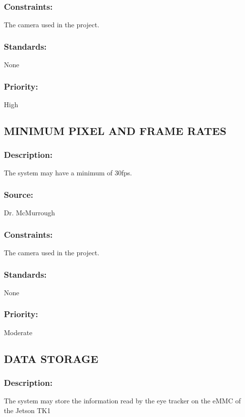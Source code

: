 \subsubsection{Constraints:} 
	{The camera used in the project.}
\subsubsection{Standards:} 
	{None}
\subsubsection{Priority:} 
	{High}
\newline
\newline
	
\subsection{\text MINIMUM PIXEL AND FRAME RATES }
\subsubsection{Description:} 
	{The system may have a minimum of 30fps.}
\subsubsection{Source:}
	{Dr. McMurrough}
\subsubsection{Constraints:} 
	{The camera used in the project.}
\subsubsection{Standards:} 
	{None}
\subsubsection{Priority:} 
	{Moderate}
\newline
\newline
	
\subsection{\text DATA STORAGE}
\subsubsection{Description:} 
	{The system may store the information read by the eye tracker on the eMMC of the Jetson TK1}
